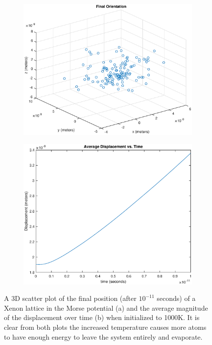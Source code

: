 \documentclass[12pt]{article}
\begin{document}
\begin{figure}[!h]
\begin{subfigure}{0.5\textwidth}
\includegraphics[width=\linewidth]{./finalpics/Mfinal1000.eps}
\caption{\label{mfinal1000}}
\end{subfigure}
\begin{subfigure}{0.5\textwidth}
\includegraphics[width=\linewidth]{./finalpics/Maverager1000.eps}
\caption{\label{maverage1000}}
\end{subfigure}
\caption{A 3D scatter plot of the final position (after $10^{-11}$ seconds) of a Xenon lattice in the Morse potential (a) and the average magnitude of the displacement over time (b)  when initialized to 1000K.  It is clear from both plots the increased temperature causes more atoms to have enough energy to leave the system entirely and evaporate.} 
\end{figure}
\end{document}
